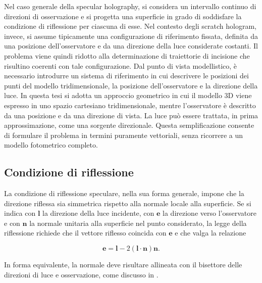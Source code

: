 \documentclass[a4paper,11pt,titlepage,twoside]{book}
\newcommand{\1}{\mathbf{1}}
\numberwithin{equation}{chapter}
\theoremstyle{plain}
\theoremstyle{definition}
\begin{document}
	Nel caso generale della specular holography, si considera un intervallo continuo di direzioni di osservazione e si progetta una superficie in grado di soddisfare la condizione di riflessione per ciascuna di esse. Nel contesto degli scratch hologram, invece, si assume tipicamente una configurazione di riferimento fissata, definita da una posizione dell’osservatore e da una direzione della luce considerate costanti. Il problema viene quindi ridotto alla determinazione di traiettorie di incisione che risultino coerenti con tale configurazione.
	Dal punto di vista modellistico, è necessario introdurre un sistema di riferimento in cui descrivere le posizioni dei punti del modello tridimensionale, la posizione dell’osservatore e la direzione della luce. In questa tesi si adotta un approccio geometrico in cui il modello 3D viene espresso in uno spazio cartesiano tridimensionale, mentre l’osservatore è descritto da una posizione e da una direzione di vista. La luce può essere trattata, in prima approssimazione, come una sorgente direzionale. Questa semplificazione consente di formulare il problema in termini puramente vettoriali, senza ricorrere a un modello fotometrico completo.
	
	\subsection{Condizione di riflessione}
	
	La condizione di riflessione speculare, nella sua forma generale, impone che la direzione riflessa sia simmetrica rispetto alla normale locale alla superficie. Se si indica con $\mathbf{l}$ la direzione della luce incidente, con $\mathbf{e}$ la direzione verso l’osservatore e con $\mathbf{n}$ la normale unitaria alla superficie nel punto considerato, la legge della riflessione richiede che il vettore riflesso coincida con $\mathbf{e}$ e che valga la relazione
	
	\[
	\mathbf{e} = \mathbf{l} - 2 (\mathbf{l} \cdot \mathbf{n}) \mathbf{n}.
	\]
	
	In forma equivalente, la normale deve risultare allineata con il bisettore delle direzioni di luce e osservazione, come discusso in \cite{Brand2011}.
	
\end{document}
